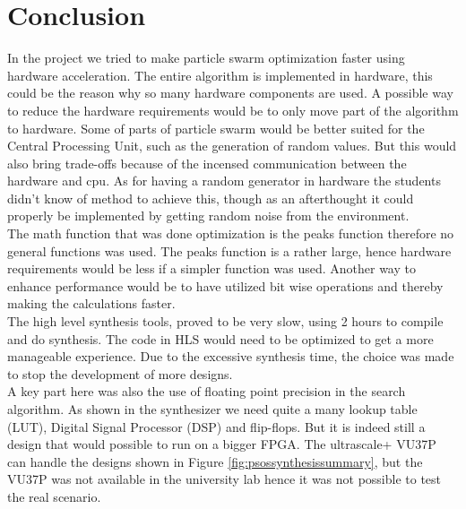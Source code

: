 \section{Conclusion}\label{sc:conclusion}
In the project we tried to make particle swarm optimization faster using hardware acceleration. 
The entire algorithm is implemented in hardware, this could be the reason why so many hardware components are used. A possible way to reduce the hardware requirements would be to only move part of the algorithm to hardware. Some of parts of particle swarm would be better suited for the Central Processing Unit, such as the generation of random values. But this would also bring trade-offs because of the incensed communication between the hardware and cpu. As for having a random generator in hardware the students didn't know of method to achieve this, though as an afterthought it could properly be implemented by getting random noise from the environment.\\

The math function that was done optimization is the peaks function therefore no general functions was used. The peaks function is a rather large, hence hardware requirements would be less if a simpler function was used. Another way to enhance performance would be to have utilized bit wise operations and thereby making the calculations faster.\\

The high level synthesis tools, proved to be very slow, using 2 hours to compile and do synthesis. The code in HLS would need to be optimized to get a more manageable experience. Due to the excessive synthesis time, the choice was made to stop the development of more designs.\\

A key part here was also the use of floating point precision in the search algorithm. As shown in the synthesizer we need quite a many lookup table (LUT), Digital Signal Processor (DSP) and flip-flops. But it is indeed still a design that would possible to run on a bigger FPGA. The ultrascale+ VU37P can handle the designs shown in Figure \ref{fig:psossynthesissummary}, but the VU37P was not available in the university lab hence it was not possible to test the real scenario. 

